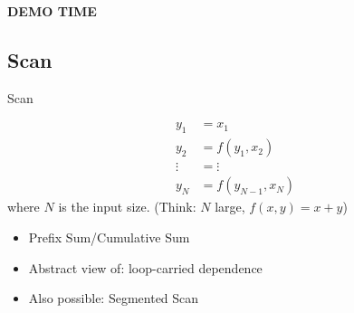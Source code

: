 \documentclass[english,compress]{beamer}
\def\bigncentered#1{
  \begin{center}
    \Huge\bfseries #1
  \end{center}
}
\begin{document}
\begin{frame}
  \bigncentered{DEMO TIME}
\end{frame}
\subsection{Scan}
\begin{frame}{Scan}

  {\Huge
  \vspace*{-1cm}
  \begin{align*}
    y_1 &= x_1 \\
    y_2 &= f(y_1, x_2)\\
    \vdots &= \vdots \\
    y_N &= f(y_{N-1}, x_N)
  \end{align*}}
  where $N$ is the input size. (Think: $N$ large, $f(x,y)=x+y$)

  \begin{itemize}
    \item Prefix Sum/Cumulative Sum
    \item Abstract view of: loop-carried dependence
    \item Also possible: Segmented Scan
  \end{itemize}
\end{frame}
\end{document}
